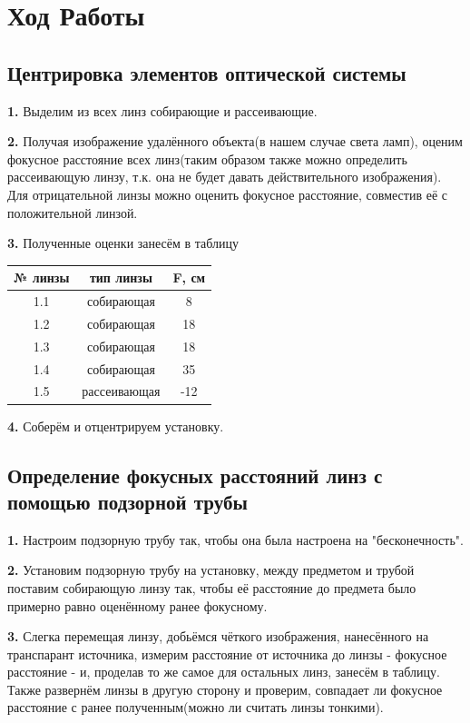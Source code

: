 \documentclass[a4paper,12pt]{article}
\begin{document}
\newpage
\section{Ход Работы}
\subsection*{Центрировка элементов оптической системы}
\textbf{1.} Выделим из всех линз собирающие и рассеивающие. 

\textbf{2.} Получая изображение удалённого объекта(в нашем случае света ламп), оценим фокусное расстояние всех линз(таким образом также можно определить рассеивающую линзу, т.к. она не будет давать действительного изображения). Для отрицательной линзы можно оценить фокусное расстояние, совместив её с положительной линзой. 

\textbf{3.} Полученные оценки занесём в таблицу

\begin{table}[H]
\centering
	\begin{tabular}{|c|c|c|}
	\hline
	№ линзы & тип линзы & F, см \\ \hline
	1.1 & собирающая & 8 \\ \hline
	1.2 & собирающая & 18 \\ \hline
	1.3 & собирающая & 18 \\ \hline
	1.4 & собирающая & 35 \\ \hline
	1.5 & рассеивающая & -12 \\ \hline
	\end{tabular}
\end{table}

\textbf{4.} Соберём и отцентрируем установку.

\subsection*{Определение фокусных расстояний линз с помощью подзорной трубы}
\textbf{1.} Настроим подзорную трубу так, чтобы она была настроена на "бесконечность".

\textbf{2.} Установим подзорную трубу на установку, между предметом и трубой поставим собирающую линзу так, чтобы её расстояние до предмета было примерно равно оценённому ранее фокусному.

\textbf{3.} Слегка перемещая линзу, добьёмся чёткого изображения, нанесённого на транспарант источника, измерим расстояние от источника до линзы - фокусное расстояние - и, проделав то же самое для остальных линз, занесём в таблицу. Также развернём линзы в другую сторону и проверим, совпадает ли фокусное расстояние с ранее полученным(можно ли считать линзы тонкими).
\end{document}
